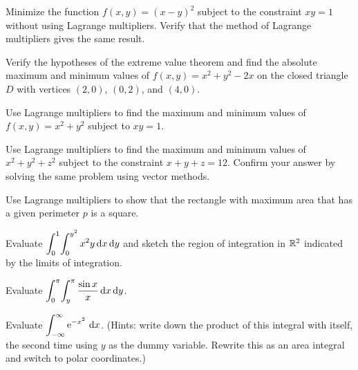 \documentclass{watsonbook}
\begin{document}
\begin{aexercise}
  Minimize the function $f(x,y) = (x-y)^2$ subject to the constraint
  $xy = 1$ without using Lagrange multipliers. Verify that the method
  of Lagrange multipliers gives the same result.
\end{aexercise}

\begin{aexercise}
  Verify the hypotheses of the extreme value theorem and find the
  absolute maximum and minimum values of $f(x,y) = x^2+y^2-2x$ on the
  closed triangle $D$ with vertices $(2,0)$, $(0,2)$, and $(4,0)$.
\end{aexercise}

\begin{aexercise}
  Use Lagrange multipliers to find the maximum and minimum values of
  $f(x,y) = x^2 + y^2$ subject to $xy = 1$.
\end{aexercise}

\begin{aexercise}
  Use Lagrange multipliers to find the maximum and minimum values of
  $x^2 + y^2 + z^2$ subject to the constraint $x + y + z =
  12$. Confirm your answer by solving the same problem using vector
  methods.
\end{aexercise}

\begin{aexercise}
  Use Lagrange multipliers to show that the rectangle with maximum
  area that has a given perimeter $p$ is a square.
\end{aexercise}


\begin{aexercise}
  Evaluate
  $\displaystyle{\int_{0}^{1}\!\int_{0}^{y^2} x^2 y \,\mathrm{d}x\,\mathrm{d}y}$ and
  sketch the region of integration in $\mathbb{R}^2$ indicated by the limits
  of integration.
\end{aexercise}

\begin{aexercise}
  Evaluate $\displaystyle{\int_{0}^\pi \!\int_{y}^{\pi}\frac{\sin x}{x} \,\mathrm{d}x\,\mathrm{d}y}$.
\end{aexercise}

\begin{aexercise}%
  Evaluate $\displaystyle{\int_{-\infty}^{\infty} \operatorname{e}^{-x^2}\,\mathrm{d}x}$. (Hints: write down
  the product of this integral with itself, the second time using $y$
  as the dummy variable. Rewrite this as an area integral and switch
  to polar coordinates.)
\end{aexercise}
\end{document}
